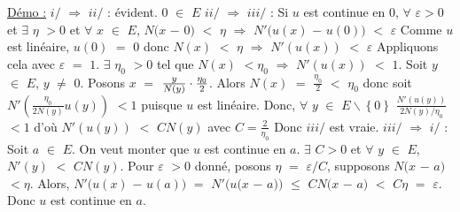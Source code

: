 \documentclass{article}
\begin{document}
\parindent=0cm
\smallbreak
\parindent=0cm
\parindent=0cm
\smallbreak
\underline{Démo :} \parindent=1cm \smallbreak
$i/$ $\Longrightarrow$ $ii/$ : évident. $0$ $\in$ $E$ \smallbreak
$ii/$ $\Longrightarrow$ $iii/$ : Si $u$ est continue en $0$, $\forall$ $\varepsilon >0$ et $\exists$ $\eta$ $>0$ et $\forall$ $x$ $\in$ $E$, $N(x$ $-$ $0)$ $<$ $\eta$ $\Longrightarrow$ $N'(u(x)$ $-$ $u(0))$ $<$ $\varepsilon$
\smallbreak
Comme $u$ est linéaire, $u(0)$ $=$ $0$ donc $N(x)$ $<$ $\eta$ $\Longrightarrow$ $N'(u(x))$ $<$ $\varepsilon$
Appliquons cela avec $\varepsilon$ $=$ $1$. \smallbreak $\exists$ $\eta_0$ $>0$ tel que $N(x)$ $<\eta_0$ $\Longrightarrow$ $N'(u(x))$ $<$ $1$. Soit $y$ $\in$ $E$, $y$
$\neq$ $0$. Posons $x$ $=$ $\frac{y}{N(y)}\cdot \frac{\eta_{\footnotesize{0}}}{2}$. Alors $N(x)$ $=$  $\frac{\eta_0}{2}$ \smallbreak $<$ $\eta_0$ donc soit $N'(\frac{\eta_0}{2N(y)}u(y))$ $<1$ puisque $u$ est linéaire. Donc, $\forall$ $y$ $\in$ $E \smallsetminus \left\{ 0 \right\}$ $\frac{N'(u(y))}{2N(y)/ \eta_0}$ $<1$ d'où \smallbreak $N'(u(y))$ $<$ $CN(y)$ avec $C = \frac{2}{\eta_0}$
Donc $iii/$ est vraie.
\smallbreak
$iii/$ $\Longrightarrow$ $i/$ : Soit $a$ $\in$ $E$. On veut monter que $u$ est continue en $a$. $\exists$ $C>0$ et $\forall$ $y$ $\in$ $E$, $N'(y)$ $<$ $CN(y)$.
\smallbreak
Pour $\varepsilon$ $>0$ donné, posons $\eta$ $=$ $\varepsilon/C$, supposons $N(x$ $-$ $a)$ $<\eta$. Alors, \smallbreak $N'(u(x)$ $-$ $u(a))$ $=$ $N'(u(x$ $-$ $a))$ $\leqslant$ $CN(x$ $-$ $a)$ $<$ $C\eta$ $=$ $\varepsilon$. Donc $u$ est continue en $a$.
\end{document}
